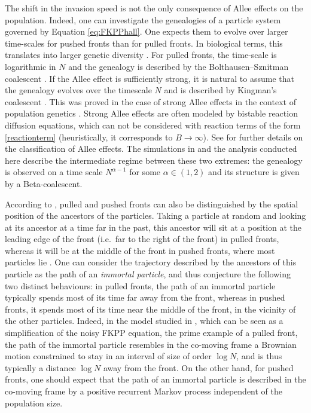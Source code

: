 \documentclass[11pt]{article}
\theoremstyle{plain}
\begin{document}
The shift in the invasion speed is not the only consequence of Allee effects on the population. Indeed, one can investigate the genealogies of a particle system governed by Equation \eqref{eq:FKPPhall}. One expects them to evolve over larger time-scales for pushed fronts than for pulled fronts. In biological terms, this translates into larger genetic diversity \cite{Hallatschek2008}. For pulled fronts, the time-scale is logarithmic in $N$ and the genealogy is described by the Bolthausen--Sznitman coalescent \cite{Brunet2008}. If the Allee effect is sufficiently strong, it is natural to assume that the genealogy evolves over the timescale $N$ and is described by Kingman's coalescent \cite{Birzu2018}. This was proved in the case of strong Allee effects in the context of population genetics \cite{etheridge2020genealogies}. Strong Allee effects are often modeled by bistable reaction diffusion equations, which can not be considered with reaction terms of the form \eqref{reactionterm} (heuristically, it corresponds to $B\to \infty$). See  \cite[Chapter 1]{these} for further details on the classification of Allee effects. The simulations in \cite{Birzu2018} and the analysis conducted here describe the intermediate regime between these two extremes: the genealogy is observed on a time scale $N^{\alpha-1}$ for some $\alpha\in(1,2)$ and its structure is given by a Beta-coalescent.

According to \cite{Birzu2018}, pulled and pushed fronts can also be distinguished by the spatial position of the ancestors of the particles. Taking a particle at random and looking at its ancestor at a time far in the past, this ancestor will sit at a position at the leading edge of the front (i.e.~far to the right of the front) in pulled fronts, whereas it will be at the middle of the front in pushed fronts, where most particles lie \cite[Fig.~2]{Birzu2018}. One can consider the trajectory described by the ancestors of this particle as the path of an \emph{immortal particle}, and thus conjecture the following two distinct behaviours: in pulled fronts, the path of an immortal particle typically spends most of its time far away from the front, whereas in pushed fronts, it spends most of its time near the middle of the front, in the vicinity of the other particles. Indeed, in the model studied in \cite{Berestycki2010}, which can be seen as a simplification of the noisy FKPP equation, the prime example of a pulled front, the path of the immortal particle resembles in the co-moving frame a Brownian motion constrained to stay in an interval of size of order $\log N$, and is thus typically a distance $\log N$ away from the front. On the other hand, for pushed fronts, one should expect that the path of an immortal particle is described in the co-moving frame by a positive recurrent Markov process independent of the population size.
\end{document}
